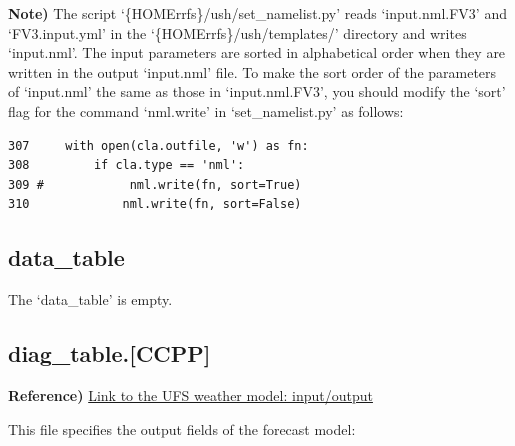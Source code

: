 \documentclass[11pt,fleqn]{report}              %
\begin{document}
{\bf Note)} The script `\{HOMErrfs\}/ush/set\_namelist.py' reads `input.nml.FV3' and `FV3.input.yml' in the `\{HOMErrfs\}/ush/templates/' directory and writes `input.nml'. The input parameters are sorted in alphabetical order when they are written in the output `input.nml' file. To make the sort order of the parameters of `input.nml' the same as those in `input.nml.FV3', you should modify the `sort' flag for the command `nml.write' in `set\_namelist.py' as follows:

\lstset{language=bash}   
\begin{lstlisting}[frame=trBL, basicstyle=\scriptsize]
307     with open(cla.outfile, 'w') as fn:
308         if cla.type == 'nml':
309 #            nml.write(fn, sort=True)
310             nml.write(fn, sort=False)
\end{lstlisting}



\subsection{data\_table}

The `data\_table' is empty.



\subsection{diag\_table.[CCPP]}
\label{subsec:diag_table}

{\bf Reference)} \href{https://ufs-weather-model.readthedocs.io/en/ufs-v2.0.0/InputsOutputs.html#model-configuration-files}{Link to the UFS weather model: input/output}

\vspace{0.3cm}

This file specifies the output fields of the forecast model:
\end{document}
